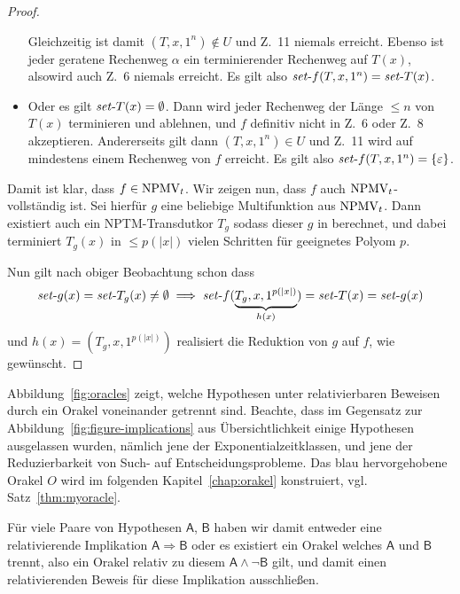 \begin{proof}
\begin{itemize}[nosep]
            Gleichzeitig ist damit $(T, x, 1^n)\not\in U$ und Z.~11 niemals erreicht.
            Ebenso ist jeder geratene Rechenweg $\alpha$ ein terminierender Rechenweg auf $T(x)$, alsowird auch Z.~6 niemals erreicht.
            Es gilt also $\mathit{set}\text{-}{f}(T, x, 1^n)=\mathit{set}\text{-}{T}(x)$.
        \item Oder es gilt $\mathit{set}\text{-}{T}(x)=\emptyset$.
            Dann wird jeder Rechenweg der Länge $\leq n$ von $T(x)$ terminieren und ablehnen, und $f$ definitiv nicht in Z.~6 oder Z.~8 akzeptieren.
            Andererseits gilt dann $(T, x, 1^n)\in U$ und Z.~11 wird auf mindestens einem Rechenweg von $f$ erreicht.
            Es gilt also $\mathit{set}\text{-}{f}(T, x, 1^n)=\{\varepsilon\}$.
    \end{itemize}

    Damit ist klar, dass $f\in\mathrm{NPMV}_t$.
    Wir zeigen nun, dass $f$ auch $\mathrm{NPMV}_t$-vollständig ist.
    Sei hierfür $g$ eine beliebige Multifunktion aus $\mathrm{NPMV}_t$.
    Dann existiert auch ein NPTM-Transdutkor $T_g$ sodass dieser $g$ in berechnet, und dabei terminiert $T_g(x)$ in $\leq p(|x|)$ vielen Schritten für geeignetes Polyom $p$.

    Nun gilt nach obiger Beobachtung schon dass 
    \[ \mathit{set}\text{-}{g}(x) = \mathit{set}\text{-}{T_g}(x)\neq\emptyset \implies \mathit{set}\text{-}{f}(\underbrace{T_g, x, 1^{p(|x|)}}_{h(x)})=\mathit{set}\text{-}{T}(x)=\mathit{set}\text{-}{g}(x) \]
    und $h(x)=(T_g, x, 1^{p(|x|)})$ realisiert die Reduktion von $g$ auf $f$, wie gewünscht.
\end{proof}


Abbildung~\ref{fig:oracles} zeigt, welche Hypothesen unter relativierbaren Beweisen durch ein Orakel voneinander getrennt sind.
Beachte, dass im Gegensatz zur Abbildung~\ref{fig:figure-implications} aus Übersichtlichkeit einige Hypothesen ausgelassen wurden, nämlich jene der Exponentialzeitklassen, und jene der Reduzierbarkeit von Such- auf Entscheidungsprobleme.
Das blau hervorgehobene Orakel $O$ wird im folgenden Kapitel~\ref{chap:orakel} konstruiert, vgl. Satz~\ref{thm:myoracle}.

Für viele Paare von Hypothesen $\mathsf{A}$, $\mathsf{B}$ haben wir damit entweder eine relativierende Implikation $\mathsf{A}\Rightarrow\mathsf{B}$ oder es existiert ein Orakel welches $\mathsf{A}$ und $\mathsf{B}$ trennt,  also ein Orakel relativ zu diesem $\mathsf{A}\land \neg\mathsf{B}$ gilt, und damit einen relativierenden Beweis für diese Implikation ausschließen. 

